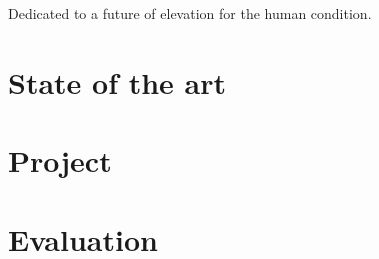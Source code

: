 



\frenchspacing
\raggedbottom
{}
\pagestyle{plain}

\cleardoublepage
\begin{center}
{\calligra
Dedicated to a future of elevation for the human condition.}
\end{center}
\cleardoublepage
\cleardoublepage\tableofcontents
\clearpage
\cleardoublepage
\newpage
{}
\pagestyle{scrheadings}
\sloppy

\part{State of the art}\label{prt:stateOfArt}

\part{Project}\label{prt:project}



\part{Evaluation}\label{prt:evaluation}




\clearpage
\nocite{*}
{}



\printindex


